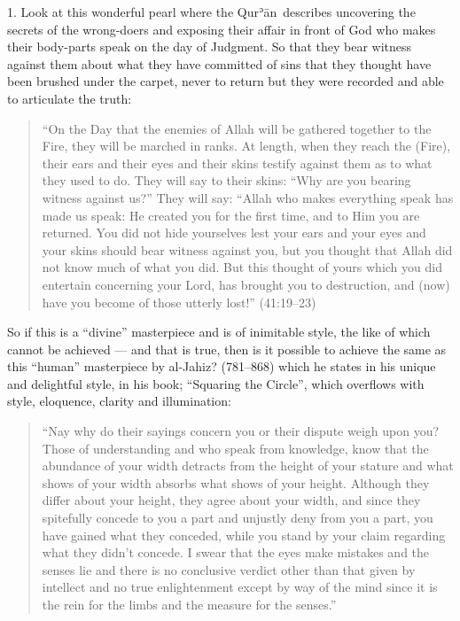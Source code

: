 \documentclass[12pt]{memoir}
\def\´{ʾ} %
\def \Quran{Qur\-\´ān} %
\def\–{-\hskip0pt}
\newcommand{\QRef}[1]{{\color{darkblue}#1}}
\let \fnmark=\footnotemark
\begin{document}
1. Look at this wonderful pearl where the \Quran\ describes uncovering
the secrets of the wrong\–doers and exposing their affair in front of God
who makes their body-parts speak on the day of Judgment.
So that they bear witness against them about what they have committed of sins
that they thought have been brushed under the carpet,
never to return but they were recorded and able to articulate the truth:

\begin{quote}
“On the Day that the enemies of Allah will be gathered together to the Fire,
they will be marched in ranks.
At length, when they reach the (Fire),
their ears and their eyes and their skins testify against them
as to what they used to do.
They will say to their skins: “Why are you bearing witness against us?”
They will say: “Allah who makes everything speak has made us speak:
He created you for the first time, and to Him you are returned.
You did not hide yourselves lest your ears and your eyes and
your skins should bear witness against you,
but you thought that Allah did not know much of what you did.
But this thought of yours which you did entertain concerning your Lord,
has brought you to destruction,
and (now) have you become of those utterly lost!” (\QRef{41:19–23})
\end{quote}

So if this is a “divine” masterpiece and is of inimitable style,
the like of which cannot be achieved —
and that is true, then is it possible to achieve
the same as this “human” masterpiece by al\–Jahiz? (781–868)
which he states in his unique and delightful style, in his book;
“Squaring the Circle”, which overflows with style,
eloquence, clarity and illumination:

\begin{quote}
“Nay why do their sayings concern you or their dispute weigh upon you?
Those of understanding and who speak from knowledge,
know that the abundance of your width detracts from the height of your stature
and what shows of your width absorbs what shows of your height.
Although they differ about your height, they agree about your width,
and since they spitefully concede to you a part and
unjustly deny from you a part, you have gained what they conceded,
while you stand by your claim regarding what they didn’t concede.
I swear that the eyes make mistakes and the senses lie and
there is no conclusive verdict other than that given by intellect and
no true enlightenment except by way of the mind since it is the rein
for the limbs and the measure for the senses.”\fnmark
\end{quote}
\end{document}
